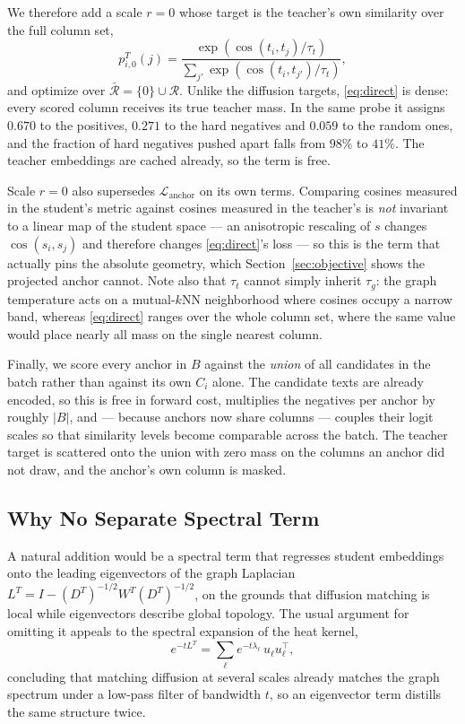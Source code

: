 We therefore add a scale $r=0$ whose target is the teacher's own similarity over the full column set,
\begin{equation}
    p_{i,0}^{T}(j)
    =
    \frac{\exp\!\left(\cos(t_i,t_j)/\tau_t\right)}
    {\sum_{j'}\exp\!\left(\cos(t_i,t_{j'})/\tau_t\right)},
    \label{eq:direct}
\end{equation}
and optimize over $\bar{\mathcal{R}}=\{0\}\cup\mathcal{R}$. Unlike the diffusion targets, \eqref{eq:direct} is dense: every scored column receives its true teacher mass. In the same probe it assigns $0.670$ to the positives, $0.271$ to the hard negatives and $0.059$ to the random ones, and the fraction of hard negatives pushed apart falls from $98\%$ to $41\%$. The teacher embeddings are cached already, so the term is free.

Scale $r=0$ also supersedes $\mathcal{L}_{\mathrm{anchor}}$ on its own terms. Comparing cosines measured in the student's metric against cosines measured in the teacher's is \emph{not} invariant to a linear map of the student space --- an anisotropic rescaling of $s$ changes $\cos(s_i,s_j)$ and therefore changes \eqref{eq:direct}'s loss --- so this is the term that actually pins the absolute geometry, which Section~\ref{sec:objective} shows the projected anchor cannot. Note also that $\tau_t$ cannot simply inherit $\tau_g$: the graph temperature acts on a mutual-$k$NN neighborhood where cosines occupy a narrow band, whereas \eqref{eq:direct} ranges over the whole column set, where the same value would place nearly all mass on the single nearest column.

Finally, we score every anchor in $B$ against the \emph{union} of all candidates in the batch rather than against its own $C_i$ alone. The candidate texts are already encoded, so this is free in forward cost, multiplies the negatives per anchor by roughly $|B|$, and --- because anchors now share columns --- couples their logit scales so that similarity levels become comparable across the batch. The teacher target is scattered onto the union with zero mass on the columns an anchor did not draw, and the anchor's own column is masked.

\subsection{Why No Separate Spectral Term}
\label{sec:no-spectral}

A natural addition would be a spectral term that regresses student embeddings onto the leading eigenvectors of the graph Laplacian $L^T = I - (D^T)^{-1/2}W^T(D^T)^{-1/2}$, on the grounds that diffusion matching is local while eigenvectors describe global topology. The usual argument for omitting it appeals to the spectral expansion of the heat kernel,
\begin{equation}
    e^{-tL^T} = \sum_{\ell} e^{-t\lambda_\ell}\, u_\ell u_\ell^{\top},
    \label{eq:heatspec}
\end{equation}
concluding that matching diffusion at several scales already matches the graph spectrum under a low-pass filter of bandwidth $t$, so an eigenvector term distills the same structure twice.

